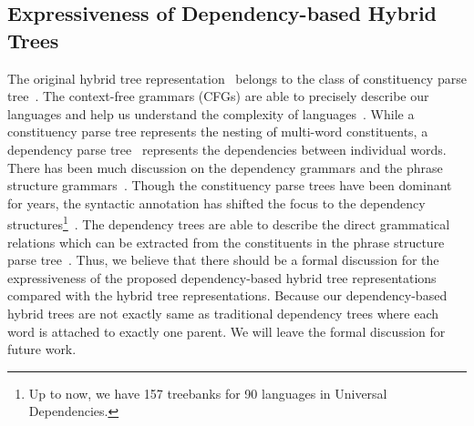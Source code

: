 \subsection{Expressiveness of Dependency-based Hybrid Trees}
The original hybrid tree representation~\cite{lu2014semantic} belongs to the class of constituency parse tree~\cite{chomsky2002syntactic}.
The context-free grammars (CFGs) are able to precisely describe our languages and help us understand the complexity of languages~\cite{johnson1998pcfg}.
While a constituency parse tree represents the nesting of multi-word constituents, a dependency parse tree~\cite{kubler2009dependency} represents the dependencies between individual words.
There has been much discussion on the dependency grammars and the phrase structure grammars~\cite{miller1999strong}. 
Though the constituency parse trees have been dominant for years, the syntactic annotation has shifted the focus to the dependency structures\footnote{Up to now, we have 157 treebanks for 90 languages in Universal Dependencies.}~\cite{eisenstein2018natural}.
The dependency trees are able to describe the direct grammatical relations which can be extracted from the constituents in the phrase structure parse tree~\cite{de2006generating}.
Thus, we believe that there should be a formal discussion for the expressiveness of the proposed dependency-based hybrid tree representations compared with the hybrid tree representations.
Because our dependency-based hybrid trees are not exactly same as traditional dependency trees where each word is attached to exactly one parent.
We will leave the formal discussion for future work.

